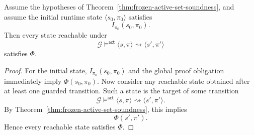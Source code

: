 \begin{corollary}
\label{cor:frozen-active-set-reachability}
Assume the hypotheses of
Theorem~\ref{thm:frozen-active-set-soundness}, and assume the initial runtime
state $\langle s_0,\pi_0\rangle$ satisfies
\[
I_{\pi_0}(s_0,\pi_0).
\]
Then every state reachable under
\[
\mathcal G \models^{\mathsf{act}} \langle s,\pi\rangle \rightsquigarrow \langle s',\pi'\rangle
\]
satisfies $\Phi$.
\end{corollary}

\begin{proof}
For the initial state, $I_{\pi_0}(s_0,\pi_0)$ and the global proof obligation
immediately imply $\Phi(s_0,\pi_0)$.
Now consider any reachable state obtained after at least one guarded transition.
Such a state is the target of some transition
\[
\mathcal G \models^{\mathsf{act}} \langle s,\pi\rangle \rightsquigarrow \langle s',\pi'\rangle.
\]
By Theorem~\ref{thm:frozen-active-set-soundness}, this implies
\[
\Phi(s',\pi').
\]
Hence every reachable state satisfies $\Phi$.
\end{proof}
